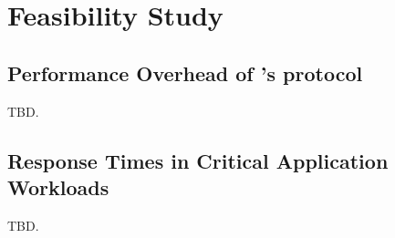 \section{Feasibility Study} \label{sec:eval}

\subsection{Performance Overhead of \xxx's \paxos protocol} \label{sec:overhead}

TBD.

\subsection{Response Times in Critical Application Workloads} 
\label{sec:workload}

TBD.

